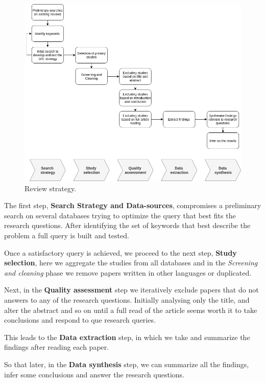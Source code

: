 \documentclass[final,3p,12pt,twocolumn]{elsarticle}
\begin{document}
\begin{figure}[h]
  \begin{center}
    \leavevmode
    \includegraphics[width=\textwidth]{figures/SLR_stages.png}
    \caption{Review strategy.}
    \label{fig:/figures/SLR_stages}
  \end{center}
\end{figure}

The first step, \textbf{Search Strategy and Data-sources}, compromises a preliminary search on several databases trying to optimize the query that best fits the research questions. After identifying the set of keywords that best describe the problem a full query is built and tested.

Once a satisfactory query is achieved, we proceed to the next step, \textbf{Study selection}, here we aggregate the studies from all databases and in the \textit{Screening and cleaning} phase we remove papers written in other languages or duplicated.

Next, in the \textbf{Quality assessment} step we iteratively exclude papers that do not answers to any of the research questions. Initially analysing only the title, and alter the abstract and so on until a full read of the article seems worth it to take conclusions and respond to que research queries.

This leads to the \textbf{Data extraction} step, in which we take and summarize the findings after reading each paper.

So that later, in the \textbf{Data synthesis} step, we can summarize all the findings, infer some conclusions and answer the research questions.
\end{document}
